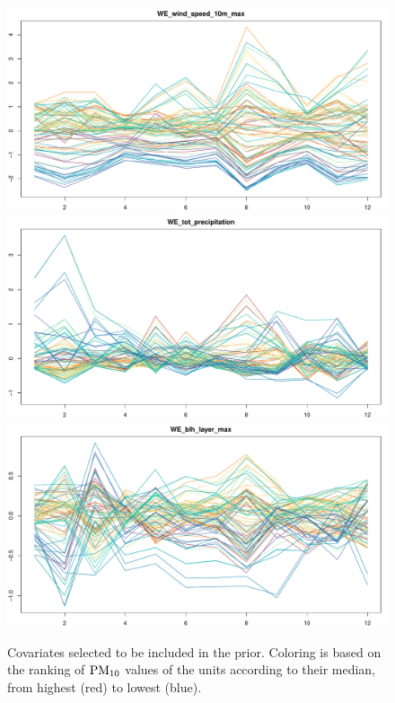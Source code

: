 \documentclass[12pt,	%
	a4paper,		%
	twoside,		%
	openright,		%
	titlepage,%
	]{book}
\theoremstyle{definition}
\begin{document}
\begin{itemize}
\begin{figure}[!p]
    \centering
    \includegraphics[width=1\linewidth]{Testing/Covariates/in clustering/covariate usate/WE_wind_speed_10m_max.pdf}
    \includegraphics[width=1\linewidth]{Testing/Covariates/in clustering/covariate usate/WE_tot_precipitation.pdf}
    \includegraphics[width=1\linewidth]{Testing/Covariates/in clustering/covariate usate/WE_blh_layer_max.pdf}
    \caption[Covariates included in the prior]{Covariates selected to be included in the prior. Coloring is based on the ranking of $\text{PM}_{10}$ values of the units according to their median, from highest (red) to lowest (blue).}
    \label{fig: covariate usate nel fit con covariate cl}
\end{figure}


\end{itemize}
\end{document}
